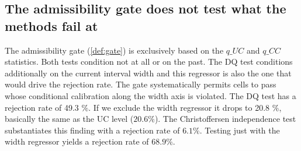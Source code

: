 \subsection{The admissibility gate does not test what the methods fail at}
\label{sec:lim:gate}
The admissibility gate (\cref{def:gate}) is exclusively based on the $q\_UC$ and $q\_CC$ statistics. Both tests condition not at all or on the past. The DQ test conditions additionally on the current interval width and this regressor is also the one that would drive the rejection rate. The gate systematically permits cells to pass whose conditional calibration along the width axis is violated.
The DQ test has a rejection rate of 49.3 $\%$. If we exclude the width regressor it drops to 20.8 $\%$, basically the same as the UC level ($20.6\%$). The Christoffersen independence test substantiates this finding with a rejection rate of $6.1\%$. Testing just with the width regressor yields a rejection rate of $68.9\%$.
%
